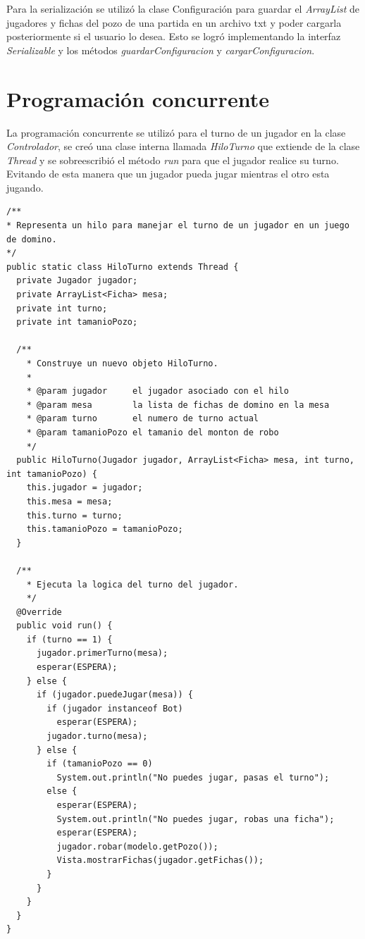 \documentclass[12pt]{article}
\begin{document}
  Para la serialización se utilizó la clase Configuración para guardar el \textit{ArrayList} de jugadores y fichas del pozo de una partida en un archivo txt y poder cargarla posteriormente si el usuario lo desea. Esto se logró implementando la interfaz \textit{Serializable} y los métodos \textit{guardarConfiguracion} y \textit{cargarConfiguracion}.

  \section{Programación concurrente}
  La programación concurrente se utilizó para el turno de un jugador en la clase \textit{Controlador}, se creó una clase interna llamada \textit{HiloTurno} que extiende de la clase \textit{Thread} y se sobreescribió el método \textit{run} para que el jugador realice su turno. Evitando de esta manera que un jugador pueda jugar mientras el otro esta jugando.
  
  \begin{lstlisting}
/**
* Representa un hilo para manejar el turno de un jugador en un juego de domino.
*/
public static class HiloTurno extends Thread {
  private Jugador jugador;
  private ArrayList<Ficha> mesa;
  private int turno;
  private int tamanioPozo;

  /**
    * Construye un nuevo objeto HiloTurno.
    * 
    * @param jugador     el jugador asociado con el hilo
    * @param mesa        la lista de fichas de domino en la mesa
    * @param turno       el numero de turno actual
    * @param tamanioPozo el tamanio del monton de robo
    */
  public HiloTurno(Jugador jugador, ArrayList<Ficha> mesa, int turno, int tamanioPozo) {
    this.jugador = jugador;
    this.mesa = mesa;
    this.turno = turno;
    this.tamanioPozo = tamanioPozo;
  }

  /**
    * Ejecuta la logica del turno del jugador.
    */
  @Override
  public void run() {
    if (turno == 1) {
      jugador.primerTurno(mesa);
      esperar(ESPERA);
    } else {
      if (jugador.puedeJugar(mesa)) {
        if (jugador instanceof Bot)
          esperar(ESPERA);
        jugador.turno(mesa);
      } else {
        if (tamanioPozo == 0)
          System.out.println("No puedes jugar, pasas el turno");
        else {
          esperar(ESPERA);
          System.out.println("No puedes jugar, robas una ficha");
          esperar(ESPERA);
          jugador.robar(modelo.getPozo());
          Vista.mostrarFichas(jugador.getFichas());
        }
      }
    }
  }
}
  \end{lstlisting}
\end{document}
